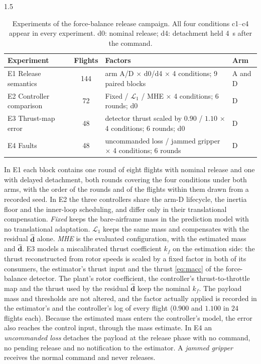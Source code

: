 \begin{spacing}{1.5}
\begin{table}[ht]
\centering
\caption[Experiments of the force-balance release campaign]{Experiments of the
force-balance release campaign. All four conditions c1--c4 appear in every
experiment. d0: nominal release; d4: detachment held \SI{4}{\second} after the
command.}
\label{tab:camp-design}
\small
\begin{tabularx}{\textwidth}{@{}l c >{\raggedright\arraybackslash}X >{\raggedright\arraybackslash}p{}@{}}
\toprule
\textbf{Experiment} & \textbf{Flights} & \textbf{Factors} & \textbf{Arm} \\
\midrule
E1 Release semantics & 144 & arm A/D $\times$ d0/d4 $\times$ 4 conditions; 9 paired blocks & A and D \\
E2 Controller comparison & 72 & Fixed / $\mathcal{L}_1$ / MHE $\times$ 4 conditions; 6 rounds; d0 & D \\
E3 Thrust-map error & 48 & detector thrust scaled by $0.90$ / $1.10$ $\times$ 4 conditions; 6 rounds; d0 & D \\
E4 Faults & 48 & uncommanded loss / jammed gripper $\times$ 4 conditions; 6 rounds & D \\
\bottomrule
\end{tabularx}
\end{table}

In E1 each block contains one round of eight flights with nominal release and
one with delayed detachment, both rounds covering the four conditions under
both arms, with the order of the rounds and of the flights within them drawn
from a recorded seed. In E2 the three controllers share the arm-D lifecycle,
the inertia floor and the inner-loop scheduling, and differ only in their
translational compensation. \emph{Fixed} keeps the bare-airframe mass in the
prediction model with no translational adaptation. \emph{$\mathcal{L}_1$} keeps
the same mass and compensates with the residual $\hat{\bm d}$ alone. \emph{MHE}
is the evaluated configuration, with the estimated mass and $\hat{\bm d}$. E3
models a miscalibrated thrust coefficient $k_f$ on the estimation side: the thrust
reconstructed from rotor speeds is scaled by a fixed factor in both of its
consumers, the estimator's thrust input and the thrust \eqref{eq:macc} of the
force-balance detector. The plant's rotor coefficient, the controller's
thrust-to-throttle map and the thrust used by the residual $\hat{\bm d}$ keep the
nominal $k_f$. The payload mass and thresholds are not altered, and the factor
actually applied is recorded in the estimator's and the controller's log of
every flight ($0.900$ and $1.100$ in $24$ flights each). Because the estimated
mass enters the controller's model, the error also reaches the control input,
through the mass estimate. In E4 an \emph{uncommanded loss} detaches the payload at the
release phase with no command, no pending release and no notification to the
estimator. A \emph{jammed gripper} receives the normal command and never
releases.


\end{spacing}
